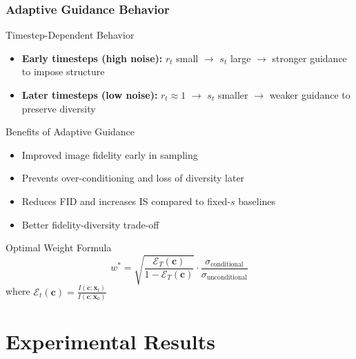 \documentclass[aspectratio=169]{beamer}
\begin{document}
\begin{frame}
\frametitle{Adaptive Guidance Behavior}
\begin{block}{Timestep-Dependent Behavior}
\begin{itemize}
\item \textbf{Early timesteps (high noise):} $r_t$ small $\rightarrow$ $s_t$ large $\rightarrow$ \textcolor{mygreen}{stronger guidance} to impose structure
\item \textbf{Later timesteps (low noise):} $r_t \approx 1$ $\rightarrow$ $s_t$ smaller $\rightarrow$ \textcolor{mygreen}{weaker guidance} to preserve diversity
\end{itemize}
\end{block}

\begin{block}{Benefits of Adaptive Guidance}
\begin{itemize}
\item \textcolor{mygreen}{Improved image fidelity} early in sampling
\item \textcolor{mygreen}{Prevents over-conditioning} and loss of diversity later
\item \textcolor{mygreen}{Reduces FID} and increases IS compared to fixed-$s$ baselines
\item \textcolor{mygreen}{Better fidelity-diversity trade-off}
\end{itemize}
\end{block}

\begin{block}{Optimal Weight Formula}
\begin{equation}
w^* = \sqrt{\frac{\mathcal{E}_T(\mathbf{c})}{1 - \mathcal{E}_T(\mathbf{c})}} \cdot \frac{\sigma_{\text{conditional}}}{\sigma_{\text{unconditional}}}
\end{equation}
where $\mathcal{E}_t(\mathbf{c}) = \frac{I(\mathbf{c}; \mathbf{x}_t)}{I(\mathbf{c}; \mathbf{x}_0)}$
\end{block}
\end{frame}

\section{Experimental Results}
\end{document}
